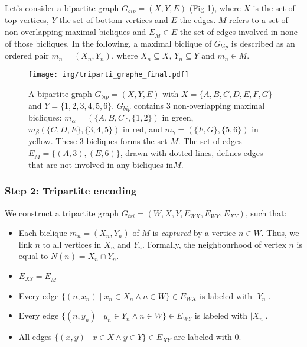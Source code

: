 \documentclass[table]{report}
\begin{document}
Let's consider a bipartite graph $G_{bip}=(X,Y,E)$ (Fig \ref{fig:triparti_graphe_exemple}), where $X$ is the set of top vertices, $Y$ the set of bottom vertices and $E$ the edges. $M$ refers to a set of non-overlapping maximal bicliques and $E_{\overline{M}} \in E$ the set of edges involved in none of those bicliques. In the following, a maximal biclique of $G_{bip}$ is described as an ordered pair $ m_n = (X_n,Y_n)$, where $X_n \subseteq X$, $Y_n \subseteq Y$ and $m_n \in M$. 
  

\begin{figure}[h]%
\centering
\texttt{[image: img/triparti\_graphe\_final.pdf]}
\caption{A bipartite graph $G_{bip} = (X,Y,E)$ with $X = \{A,B,C,D,E,F,G\}$ and $Y= \{1,2,3,4,5,6\}$. $G_{bip}$ contains 3 non-overlapping maximal bicliques: 
$m_\alpha = (\{A,B,C\}, \{1,2\})$ in green,  
$m_\beta(\{C,D,E\}, \{3,4,5\})$ in red, 
and $m_\gamma = (\{F,G\}, \{5,6\})$ in yellow. These 3 bicliques forms the set $M$. 
The set of edges $E_{\overline{M}} = \{(A,3),(E,6)\}$, drawn with dotted lines, defines edges that are not involved in any bicliques in$M$.}
\label{fig:triparti_graphe_exemple}
\end{figure}
\FloatBarrier


\subsubsection{Step 2: Tripartite encoding}

\noindent
We construct a tripartite graph $G_{tri}=(W,X,Y,E_{WX},E_{WY},E_{XY} )$, such that:
\begin{itemize}[noitemsep]
\item Each biclique $m_n = (X_n, Y_n)$ of $M$ is \textit{captured} by a vertice $n \in W$. Thus, we link $n$ to all vertices in $X_n$ and $Y_n$. Formally, the neighbourhood of vertex $n$ is equal to $N(n) = X_n \cap Y_n$. 
\item $E_{XY} = E_{\overline{M}}$
\item Every edge $\{(n, x_n) \mid x_n \in X_n \wedge n \in W\} \in E_{WX}$ is labeled with $|Y_n|$.
\item Every edge $\{(n, y_n) \mid y_n \in Y_n \wedge n \in W\} \in E_{WY}$ is labeled with $|X_n|$.
\item All edges $\{(x, y) \mid x \in X \wedge y \in Y \} \in E_{XY}$ are labeled with 0.
\end{itemize}

\end{document}
